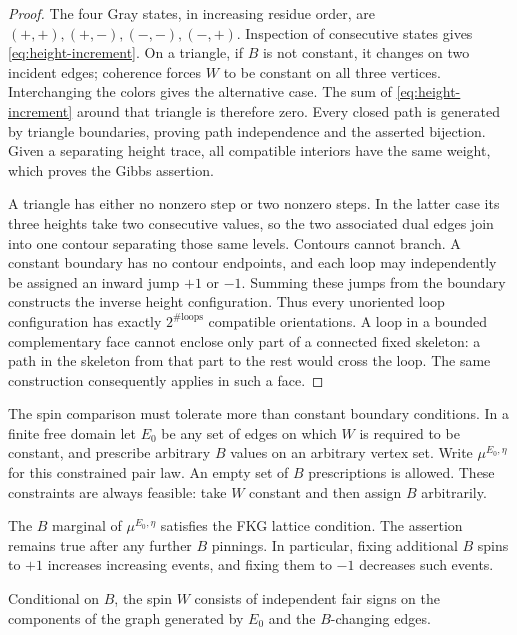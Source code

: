 \begin{proof}
The four Gray states, in increasing residue order, are
$(+,+),(+,-),(-,-),(-,+)$.  Inspection of consecutive states gives
\eqref{eq:height-increment}.  On a triangle, if $B$ is not constant, it
changes on two incident edges; coherence forces $W$ to be constant on all
three vertices.  Interchanging the colors gives the alternative case.
The sum of \eqref{eq:height-increment} around that triangle is therefore
zero.  Every closed path is generated by triangle boundaries, proving
path independence and the asserted bijection.  Given a separating height
trace, all compatible interiors have the same weight, which proves the
Gibbs assertion.

A triangle has either no nonzero step or two nonzero steps.  In the latter
case its three heights take two consecutive values, so the two associated
dual edges join into one contour separating those same levels.  Contours
cannot branch.  A constant boundary has no contour endpoints, and each
loop may independently be assigned an inward jump $+1$ or $-1$.
Summing these jumps from the boundary constructs the inverse height
configuration.  Thus every unoriented loop configuration has exactly
$2^{\#\mathrm{loops}}$ compatible orientations.  A loop in a bounded
complementary face cannot enclose only part of a connected fixed skeleton:
a path in the skeleton from that part to the rest would cross the loop.
The same construction consequently applies in such a face.
\end{proof}

The spin comparison must tolerate more than constant boundary conditions.
In a finite free domain let $E_0$ be any set of edges on which $W$ is required
to be constant, and prescribe arbitrary $B$ values on an arbitrary vertex
set.  Write $\mu^{E_0,\eta}$ for this constrained pair law.  An empty set of
$B$ prescriptions is allowed.  These constraints are always feasible: take
$W$ constant and then assign $B$ arbitrarily.

\begin{lemma}\label{lem:spin-fkg}
The $B$ marginal of $\mu^{E_0,\eta}$ satisfies the FKG lattice condition.
The assertion remains true after any further $B$ pinnings.  In particular,
fixing additional $B$ spins to $+1$ increases increasing events, and fixing
them to $-1$ decreases such events.

Conditional on $B$, the spin $W$ consists of independent fair signs on the
components of the graph generated by $E_0$ and the $B$-changing edges.
\end{lemma}

